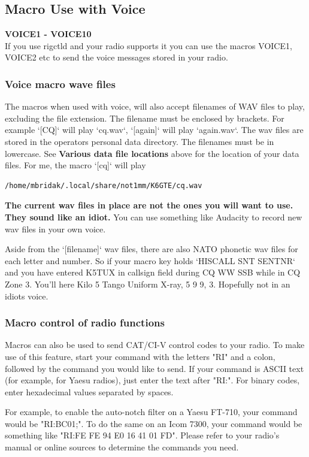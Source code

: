 \documentclass{article}
\begin{document}
\subsection{Macro Use with Voice}
\textbf{{VOICE1} - {VOICE10}}\\
If you use rigctld and your radio supports it you can use the macros {VOICE1}, {VOICE2} etc to send the voice messages stored in your radio.
\subsubsection{Voice macro wave files}
The macros when used with voice, will also accept filenames of WAV files to play, excluding the file extension. The filename must be enclosed by brackets. For example `[CQ]` will play `cq.wav`, `[again]` will play `again.wav`. The wav files are stored in the operators personal data directory. The filenames must be in lowercase. See \textbf{Various data file locations} above for the location of your data files. For me, the macro `[cq]` will play 
\begin{verbatim}/home/mbridak/.local/share/not1mm/K6GTE/cq.wav
\end{verbatim}

\textbf{The current wav files in place are not the ones you will want to use. They sound like an idiot.} You can use something like Audacity to record new wav files in your own voice.

Aside from the `[filename]` wav files, there are also NATO phonetic wav files for each letter and number. So if your macro key holds `{HISCALL} {SNT} {SENTNR}` and you have entered K5TUX in callsign field during CQ WW SSB while in CQ Zone 3. You'll here Kilo 5 Tango Uniform X-ray, 5 9 9, 3. Hopefully not in an idiots voice.
\subsubsection{Macro control of radio functions}
Macros can also be used to send CAT/CI-V control codes to your radio. To make use of this feature, start your command with the letters "RI" and a colon, followed by the command you would like to send. If your command is ASCII text (for example, for Yaesu radios), just enter the text after "RI:". For binary codes, enter hexadecimal values separated by spaces.

For example, to enable the auto-notch filter on a Yaesu FT-710, your command would be "RI:BC01;". To do the same on an Icom 7300, your command would be something like "RI:FE FE 94 E0 16 41 01 FD". Please refer to your radio's manual or online sources to determine the commands you need.
\end{document}
